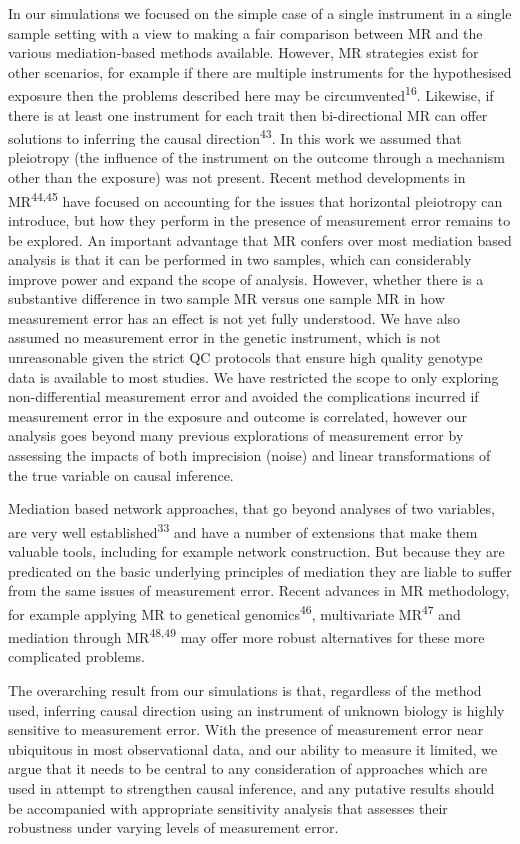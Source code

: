 \documentclass[]{article}
\begin{document}
In our simulations we focused on the simple case of a single instrument
in a single sample setting with a view to making a fair comparison
between MR and the various mediation-based methods available. However,
MR strategies exist for other scenarios, for example if there are
multiple instruments for the hypothesised exposure then the problems
described here may be circumvented\textsuperscript{16}. Likewise, if
there is at least one instrument for each trait then bi-directional MR
can offer solutions to inferring the causal
direction\textsuperscript{43}. In this work we assumed that pleiotropy
(the influence of the instrument on the outcome through a mechanism
other than the exposure) was not present. Recent method developments in
MR\textsuperscript{44,45} have focused on accounting for the issues that
horizontal pleiotropy can introduce, but how they perform in the
presence of measurement error remains to be explored. An important
advantage that MR confers over most mediation based analysis is that it
can be performed in two samples, which can considerably improve power
and expand the scope of analysis. However, whether there is a
substantive difference in two sample MR versus one sample MR in how
measurement error has an effect is not yet fully understood. We have
also assumed no measurement error in the genetic instrument, which is
not unreasonable given the strict QC protocols that ensure high quality
genotype data is available to most studies. We have restricted the scope
to only exploring non-differential measurement error and avoided the
complications incurred if measurement error in the exposure and outcome
is correlated, however our analysis goes beyond many previous
explorations of measurement error by assessing the impacts of both
imprecision (noise) and linear transformations of the true variable on
causal inference.

Mediation based network approaches, that go beyond analyses of two
variables, are very well established\textsuperscript{33} and have a
number of extensions that make them valuable tools, including for
example network construction. But because they are predicated on the
basic underlying principles of mediation they are liable to suffer from
the same issues of measurement error. Recent advances in MR methodology,
for example applying MR to genetical genomics\textsuperscript{46},
multivariate MR\textsuperscript{47} and mediation through
MR\textsuperscript{48,49} may offer more robust alternatives for these
more complicated problems.

The overarching result from our simulations is that, regardless of the
method used, inferring causal direction using an instrument of unknown
biology is highly sensitive to measurement error. With the presence of
measurement error near ubiquitous in most observational data, and our
ability to measure it limited, we argue that it needs to be central to
any consideration of approaches which are used in attempt to strengthen
causal inference, and any putative results should be accompanied with
appropriate sensitivity analysis that assesses their robustness under
varying levels of measurement error.
\end{document}
